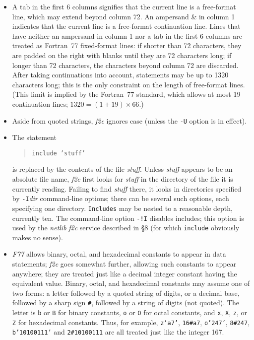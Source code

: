 \documentclass[12pt]{article}
\begin{document}
\begin{itemize}
\item A tab in the first 6 columns signifies that the current line is a free-format line, which may extend beyond column 72. An ampersand \& in column 1 indicates that the current line is a free-format continuation line. Lines that have neither an ampersand in column 1 nor a tab in the first 6 columns are treated as Fortran~77 fixed-format lines: if shorter than 72 characters, they are padded on the right with blanks until they are 72 characters long; if longer than 72 characters, the characters beyond column 72 are discarded. After taking continuations into account, statements may be up to 1320 characters long; this is the only constraint on the length of free-format lines. (This limit is implied by the Fortran~77 standard, which allows at most 19 continuation lines; $1320 = ( 1 + 19 ) \times 66$.)

\item Aside from quoted strings, \emph{f2c} ignores case (unless the \verb|-U| option is in effect).

\item The statement
\begin{quote}
\begin{verbatim}
include ’stuff’
\end{verbatim}
\end{quote}
is replaced by the contents of the file \emph{stuff}. Unless \emph{stuff} appears to be an absolute file name, \emph{f2c} first looks for \emph{stuff} in the directory of the file it is currently reading. Failing to find \emph{stuff} there, it looks in directories specified by \verb|-I|\emph{dir} command-line options; there can be several such options, each specifying one directory. \verb|Includes| may be nested to a reasonable depth, currently ten. The command-line option \verb|-!I| disables includes; this option is used by the \emph{netlib} \emph{f2c} service described in §8 (for which \verb|include| obviously makes no sense).

\item \emph{F77} allows binary, octal, and hexadecimal constants to appear in data statements; \emph{f2c} goes somewhat further, allowing such constants to appear anywhere; they are treated just like a decimal integer constant having the equivalent value. Binary, octal, and hexadecimal constants may assume one of two forms: a letter followed by a quoted string of digits, or a decimal base, followed by a sharp sign \verb|#|, followed by a string of digits (not quoted). The letter is \verb|b| or \verb|B| for binary constants, \verb|o| or \verb|O| for octal constants, and \verb|x|, \verb|X|, \verb|z|, or \verb|Z| for hexadecimal constants. Thus, for example, \verb|z’a7’|, \verb|16#a7|, \verb|o’247’|, \verb|8#247|, \verb|b’10100111’| and \verb|2#10100111| are all treated just like the integer 167.


\end{itemize}
\end{document}
